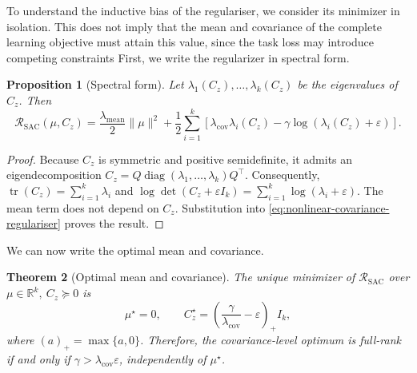 \documentclass{article} %
\newtheorem{theorem}{Theorem}[section]
\newtheorem{proposition}[theorem]{Proposition}
\theoremstyle{remark}
\begin{document}
To understand the inductive bias of the regulariser, we consider its minimizer in isolation. This does not imply that the mean and covariance of the complete learning objective must attain this value, since the task loss may introduce competing constraints First, we write the regularizer in spectral form.


\begin{proposition}[Spectral form]
\label{prop:nonlinear-covariance-spectral-form}
Let $\lambda_1(C_z),\ldots,\lambda_k(C_z)$ be the eigenvalues of \(C_z\). Then
\begin{equation}
\mathcal{R}_{\mathrm{SAC}}(\mu,C_z)
=
\frac{\lambda_{\mathrm{mean}}}{2}\|\mu\|^2
+
\frac{1}{2}
\sum_{i=1}^{k}
\left[
    \lambda_{\mathrm{cov}}\lambda_i(C_z)
    -
    \gamma\log\left(
        \lambda_i(C_z)+\varepsilon
    \right)
\right].
\label{eq:nonlinear-covariance-eigenvalue-form}
\end{equation}
\end{proposition}
\begin{proof}
Because \(C_z\) is symmetric and positive semidefinite, it admits an eigendecomposition
$C_z=Q\operatorname{diag}(\lambda_1,\ldots,\lambda_k)Q^\top$. Consequently,
$\operatorname{tr}(C_z)=\sum_{i=1}^{k}\lambda_i$ and $\log\det(C_z+\varepsilon I_k)
=\sum_{i=1}^{k}\log(\lambda_i+\varepsilon)$. The mean term does not depend on $C_z$. Substitution
into \eqref{eq:nonlinear-covariance-regulariser} proves the result.
\end{proof}

We can now write the optimal mean and covariance.

\begin{theorem}[Optimal mean and covariance]
\label{thm:nonlinear-optimal-covariance}
The unique minimizer of \(\mathcal{R}_{\mathrm{SAC}}\) over $\mu\in\mathbb R^k,\ C_z\succeq0$ is
\begin{equation}
\boxed{
\mu^\star=0,
\qquad
C_z^\star
=
\left(
    \frac{\gamma}{\lambda_{\mathrm{cov}}}
    -
    \varepsilon
\right)_{+}I_k
},
\label{eq:nonlinear-optimal-covariance}
\end{equation}
where $(a)_{+}=\max\{a,0\}$. Therefore, the covariance-level optimum is full-rank if and only if
$\gamma>\lambda_{\mathrm{cov}}\varepsilon$, independently of $\mu^\star$.
\end{theorem}
\end{document}
